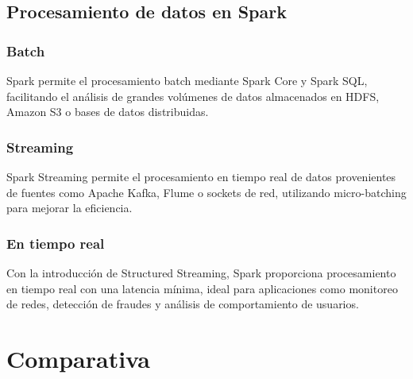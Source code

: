 \documentclass[12pt]{article}
\begin{document}
\subsection{Procesamiento de datos en Spark}

\subsubsection{Batch}
Spark permite el procesamiento batch mediante Spark Core y Spark SQL, facilitando el análisis de grandes volúmenes de datos almacenados en HDFS, Amazon S3 o bases de datos distribuidas.

\subsubsection{Streaming}
Spark Streaming permite el procesamiento en tiempo real de datos provenientes de fuentes como Apache Kafka, Flume o sockets de red, utilizando micro-batching para mejorar la eficiencia.

\subsubsection{En tiempo real}
Con la introducción de Structured Streaming, Spark proporciona procesamiento en tiempo real con una latencia mínima, ideal para aplicaciones como monitoreo de redes, detección de fraudes y análisis de comportamiento de usuarios.


\section{Comparativa}
\end{document}
